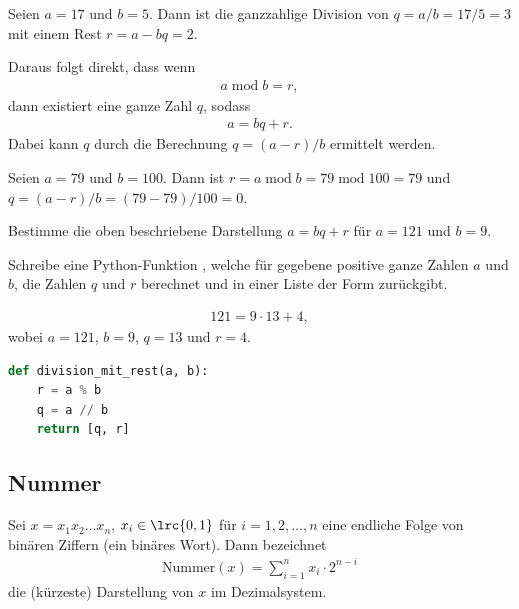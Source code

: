 \begin{myexample}
Seien $a = 17$ und $b = 5$. Dann ist die ganzzahlige Division von $ q = a / b = 17 / 5 = 3$ mit einem Rest $r = a - bq=2$.
\end{myexample}
Daraus folgt direkt, dass wenn
\begin{align}
	a\; \text{mod}\; b = r,
\end{align}
dann existiert eine ganze Zahl $q$, sodass
\begin{align}
	a = bq + r.
\end{align}
Dabei kann $q$ durch die Berechnung $q = (a - r) / b$ ermittelt werden.

\begin{myexample}
Seien $a = 79$ und $b = 100$. Dann ist  $r = a\; \text{mod}\; b = 79\; \text{mod}\; 100 = 79$ und $q = (a-r) / b = (79 - 79) / 100 = 0$.
\end{myexample}

\begin{myexercise}
	\begin{aenum}
		\item Bestimme die oben beschriebene Darstellung $a = bq + r$ für $a = 121$ und $b = 9$.
		\item Schreibe eine Python-Funktion , welche für gegebene positive ganze Zahlen $a$ und $b$, die Zahlen $q$ und $r$ berechnet und in einer Liste der Form \pythoninline{[q, r]} zurückgibt.
	\end{aenum}
	\begin{myanswer}
		\begin{aenum}
			\item \begin{align*}
				121 = 9\cdot 13 + 4,
			\end{align*}
			wobei $a = 121$, $b = 9$, $q = 13$ und $r = 4$.
			\item \leavevmode
			\begin{lstlisting}[language=Python,caption=Division mit Rest,numbers=none]
def division_mit_rest(a, b):
    r = a % b
    q = a // b
    return [q, r]
\end{lstlisting}
		\end{aenum}
	\end{myanswer}
\end{myexercise}

\subsection{Nummer}
Sei $x=x_1x_2\ldots x_n$, $x_i\in\lrc{0,1}$ für $i = 1,2,\ldots, n$ eine endliche Folge von binären Ziffern (ein binäres Wort). Dann bezeichnet
\begin{align}
	\text{Nummer}(x)=\displaystyle\sum_{i=1}^n x_i\cdot 2^{n-i}
\end{align}
die (kürzeste) Darstellung von $x$ im Dezimalsystem.


